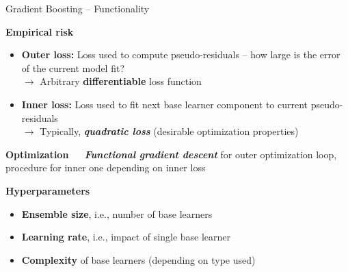 \documentclass[11pt,compress,t,notes=noshow, xcolor=table]{beamer}
\newcommand{\highlight}[1]{\textcolor{highlightcol}{\textbf{#1}}}
\newcommand{\bfit}[1]{\textbf{\textit{#1}}}
\begin{document}

\begin{frame}{Gradient Boosting -- Functionality}

\footnotesize

\highlight{Empirical risk}

\begin{itemize}
  \item \textbf{Outer loss:} Loss used to compute pseudo-residuals -- how large 
  is the error of the current model fit? \\
  $\rightarrow$ Arbitrary \textbf{differentiable} loss function
  \item \textbf{Inner loss:} Loss used to fit next base learner component to 
  current pseudo-residuals \\
  $\rightarrow$ Typically, \bfit{quadratic loss} (desirable 
  optimization properties)
\end{itemize}

\medskip

\highlight{Optimization} ~~ \bfit{Functional gradient descent} for outer 
optimization loop, procedure for inner one depending on inner loss

\medskip

\highlight{Hyperparameters}

\begin{itemize}
  \item \textbf{Ensemble size}, i.e., number of base learners
  \item \textbf{Learning rate}, i.e., impact of single base learner
  \item \textbf{Complexity} of base learners (depending on type used)
\end{itemize}

\end{frame}

\end{document}
